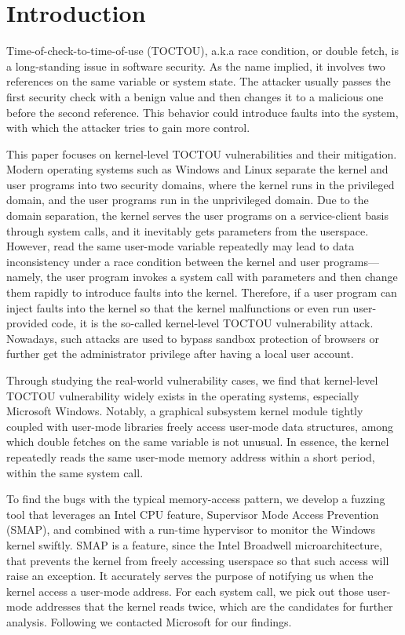 
\section{Introduction}
\label{sec:ktoctou-introduction}


Time-of-check-to-time-of-use (TOCTOU), a.k.a race condition, or double fetch, is a long-standing issue in software security. As the name implied, it involves two references on the same variable or system state. The attacker usually passes the first security check with a benign value and then changes it to a malicious one before the second reference. This behavior could introduce faults into the system, with which the attacker tries to gain more control.

This paper focuses on kernel-level TOCTOU vulnerabilities and their mitigation. Modern operating systems such as Windows and Linux separate the kernel and user programs into two security domains,  where the kernel runs in the privileged domain, and the user programs run in the unprivileged domain. Due to the domain separation, the kernel serves the user programs on a service-client basis through system calls, and it inevitably gets parameters from the userspace. However, read the same user-mode variable repeatedly may lead to data inconsistency under a race condition between the kernel and user programs---namely, the user program invokes a system call with parameters and then change them rapidly to introduce faults into the kernel. Therefore, if a user program can inject faults into the kernel so that the kernel malfunctions or even run user-provided code, it is the so-called kernel-level TOCTOU vulnerability attack.  Nowadays, such attacks are used to bypass sandbox protection of browsers or further get the administrator privilege after having a local user account.

Through studying the real-world vulnerability cases,  we find that kernel-level TOCTOU vulnerability widely exists in the operating systems, especially Microsoft Windows. Notably, a graphical subsystem kernel module tightly coupled with user-mode libraries freely access user-mode data structures, among which double fetches on the same variable is not unusual. In essence, the kernel repeatedly reads the same user-mode memory address within a short period, within the same system call.

To find the bugs with the typical memory-access pattern, we develop a fuzzing tool that leverages an Intel CPU feature, Supervisor Mode Access Prevention (SMAP), and combined with a run-time hypervisor to monitor the Windows kernel swiftly. SMAP is a feature, since the Intel Broadwell microarchitecture, that prevents the kernel from freely accessing userspace so that such access will raise an exception. It accurately serves the purpose of notifying us when the kernel access a user-mode address. For each system call, we pick out those user-mode addresses that the kernel reads twice, which are the candidates for further analysis. Following we contacted Microsoft for our findings.


